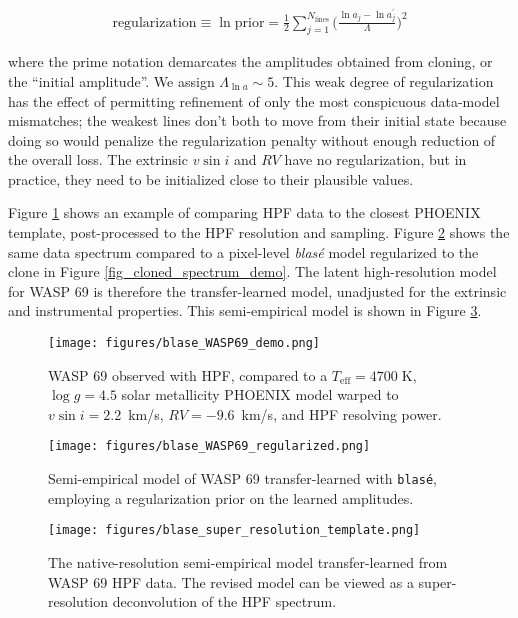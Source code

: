 \documentclass[modern]{aastex631}
\begin{document}
\begin{eqnarray}
    \mathrm{regularization} \equiv \ln{\mathrm{prior}}  = \frac{1}{2} \sum_{j=1}^{N_\mathrm{lines}} \Big(\frac{\ln{a_j} - \ln{a^\prime_j }}{\Lambda}\Big)^2
\end{eqnarray}

where the prime notation demarcates the amplitudes obtained from cloning, or the ``initial amplitude''.  We assign $\Lambda_{\ln{a}}\sim5$.  This weak degree of regularization has the effect of permitting refinement of only the most conspicuous data-model mismatches; the weakest lines don't both to move from their initial state because doing so would penalize the regularization penalty without enough reduction of the overall loss.  The extrinsic $v\sin{i}$ and $RV$ have no regularization, but in practice, they need to be initialized close to their plausible values.

Figure \ref{fig_WASP69_demo} shows an example of comparing HPF data to the closest PHOENIX template, post-processed to the HPF resolution and sampling.  Figure \ref{fig_WASP69_transferred} shows the same data spectrum compared to a pixel-level \emph{blas\'e} model regularized to the clone in Figure \ref{fig_cloned_spectrum_demo}.  The latent high-resolution model for WASP 69 is therefore the transfer-learned model, unadjusted for the extrinsic and instrumental properties.  This semi-empirical model is shown in Figure \ref{fig_WASP69_regularized}.


\begin{figure}[hbt!]
    \centering
    \texttt{[image: figures/blase\_WASP69\_demo.png]}
    \caption{WASP 69 observed with HPF, compared to a $T_{\mathrm{eff}}=4700\;$K,  $\log{g}=4.5$ solar metallicity PHOENIX model warped to $v\sin{i}=2.2$~km/s, $RV=-9.6$~km/s, and HPF resolving power.}
    \label{fig_WASP69_demo}
\end{figure}

\begin{figure}[hbt!]
    \centering
    \texttt{[image: figures/blase\_WASP69\_regularized.png]}
    \caption{Semi-empirical model of WASP 69 transfer-learned with \texttt{blas\'e}, employing a regularization prior on the learned amplitudes.}
    \label{fig_WASP69_transferred}
\end{figure}

\begin{figure}[hbt!]
    \centering
    \texttt{[image: figures/blase\_super\_resolution\_template.png]}
    \caption{The native-resolution semi-empirical model transfer-learned from WASP 69 HPF data. The revised model can be viewed as a super-resolution deconvolution of the HPF spectrum.}
    \label{fig_WASP69_regularized}
\end{figure}
\end{document}
